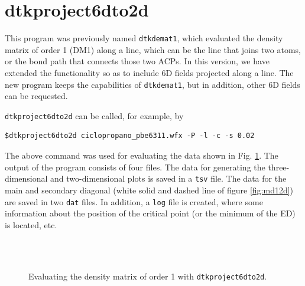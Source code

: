\section{dtkproject6dto2d}

This program was previously named \texttt{dtkdemat1}, which evaluated the density matrix of order 1 (DM1) along a line, which can be the line that joins two atoms, or the bond path that connects those two ACPs. In this version, we have extended the functionality so as to include 6D fields projected along a line.
The new program keeps the capabilities of \texttt{dtkdemat1}, but in addition, other 6D fields can be requested. 

\texttt{dtkproject6dto2d} can be called, for example, by\\
\begin{lstlisting}
$dtkproject6dto2d ciclopropano_pbe6311.wfx -P -l -c -s 0.02
\end{lstlisting}

The above command was used for evaluating the data shown in Fig. \ref{fig:dtkproject6dto2dusex}. The output of the program consists of four files. The data for generating the three-dimensional and two-dimensional plots is saved in a \texttt{tsv} file. The data for the main and secondary diagonal (white solid and dashed line of figure \ref{fig:md12d}) are saved in two \texttt{dat} files. In addition, a \texttt{log} file is created, where some information about the position of the critical point (or the minimum of the ED) is located, etc.
%
\begin{figure}[hb!]
\centering
{}\quad
{}\\
\quad
{}\\
\caption{Evaluating the density matrix of order 1 with \texttt{dtkproject6dto2d}.}\label{fig:dtkproject6dto2dusex}
\end{figure}
%


